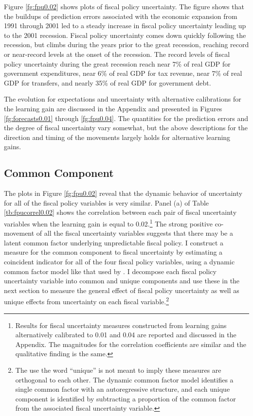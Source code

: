 \documentclass[11pt]{article}
\newcommand{\citee}[1]{\citet{#1}}
\begin{document}
Figure \ref{fg:fpu0.02} shows plots of fiscal policy uncertainty.  The figure shows that the buildups of prediction errors associated with the economic expansion from 1991 through 2001 led to a steady increase in fiscal policy uncertainty leading up to the 2001 recession.  Fiscal policy uncertainty comes down quickly following the recession, but climbs during the years prior to the great recession, reaching record or near-record levels at the onset of the recession.  The record levels of fiscal policy uncertainty during the great recession reach near 7\% of real GDP for government expenditures, near 6\% of real GDP for tax revenue, near 7\% of real GDP for transfers, and nearly 35\% of real GDP for government debt.  

The evolution for expectations and uncertainty with alternative calibrations for the learning gain are discussed in the Appendix and presented in Figures \ref{fg:forecasts0.01} through \ref{fg:fpu0.04}.  The quantities for the prediction errors and the degree of fiscal uncertainty vary somewhat, but the above descriptions for the direction and timing of the movements largely holds for alternative learning gains.

\subsection{Common Component}\label{s:common}

The plots in Figure \ref{fg:fpu0.02} reveal that the dynamic behavior of uncertainty for all of the fiscal policy variables is very similar.  Panel (a) of Table \ref{tb:fpucorrel0.02} shows the correlation between each pair of fiscal uncertainty variables when the learning gain is equal to 0.02.\footnote{Results for fiscal uncertainty measures constructed from learning gains alternatively calibrated to 0.01 and 0.04 are reported and discussed in the Appendix.  The magnitudes for the correlation coefficients are similar and the qualitative finding is the same.}  The strong positive co-movement of all the fiscal uncertainty variables suggests that there may be a latent common factor underlying unpredictable fiscal policy.  I construct a measure for the common component to fiscal uncertainty by estimating a coincident indicator for all of the four fiscal policy variables, using a dynamic common factor model like that used by \citee{StockWatson1989}.  I decompose each fiscal policy uncertainty variable into common and unique components and use these in the next section to measure the general effect of fiscal policy uncertainty as well as unique effects from uncertainty on each fiscal variable.\footnote{The use the word ``unique'' is not meant to imply these measures are orthogonal to each other.  The dynamic common factor model identifies a single common factor with an autoregressive structure, and each unique component is identified by subtracting a proportion of the common factor from the associated fiscal uncertainty variable.}  
\end{document}
